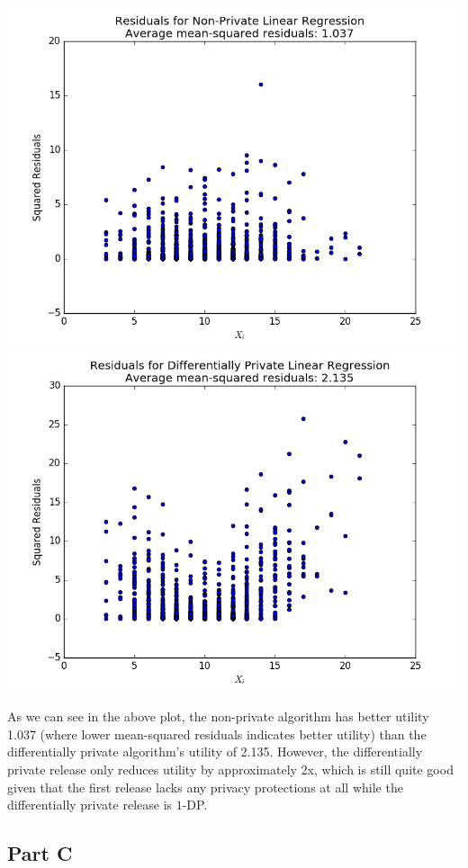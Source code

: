\documentclass[12pt]{article}
\begin{document}
\includegraphics[scale=0.4]{problem_3_non_private.png} \includegraphics[scale=0.4]{problem_3_differentially_private.png}

As we can see in the above plot, the non-private algorithm has better utility 1.037 (where lower mean-squared residuals indicates better utility) than the differentially private algorithm's utility of 2.135. However, the differentially private release only reduces utility by approximately 2x, which is still quite good given that the first release lacks any privacy protections at all while the differentially private release is $1$-DP.

\subsection{Part C}
\end{document}
